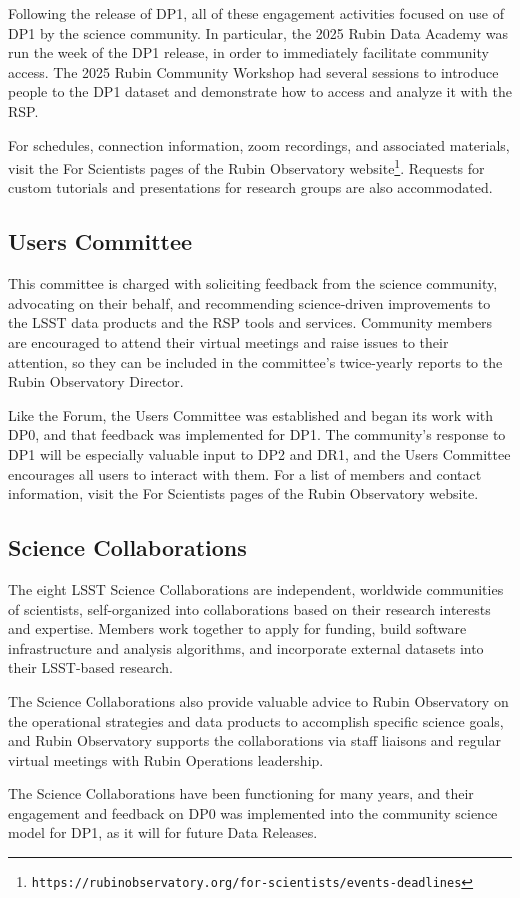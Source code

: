 Following the release of \gls{DP1}, all of these engagement activities focused on use of \gls{DP1} by the science community.
In particular, the 2025 Rubin Data Academy was run the week of the \gls{DP1} release, in order to immediately facilitate community access.
The 2025 Rubin Community Workshop had several sessions to introduce people to the \gls{DP1} dataset and demonstrate how to access and analyze it with the \gls{RSP}.

For schedules, connection information, zoom recordings, and associated materials, visit the For Scientists pages of the Rubin Observatory website\footnote{\nolinkurl{https://rubinobservatory.org/for-scientists/events-deadlines}}.
Requests for custom tutorials and presentations for research groups are also accommodated.


\subsection{Users Committee}
\label{ssec:users_committee}

This committee is charged with soliciting feedback from the science community, advocating on their behalf, and recommending science-driven improvements to the \gls{LSST} data products and the \gls{RSP} tools and services.
Community members are encouraged to attend their virtual meetings and raise issues to their attention, so they can be included in the committee's twice-yearly reports to the Rubin Observatory \gls{Director}.

Like the Forum, the Users Committee was established and began its work with \gls{DP0}, and that feedback was implemented for \gls{DP1}. 
The community's response to \gls{DP1} will be especially valuable input to \gls{DP2} and \gls{DR1}, and the Users Committee encourages all users to interact with them.
For a list of members and contact information, visit the For Scientists pages of the Rubin Observatory website.


\subsection{Science Collaborations}
\label{ssec:science_collaborations}

The eight \gls{LSST} Science Collaborations are independent, worldwide communities of scientists, self-organized into collaborations based on their research interests and expertise.
Members work together to apply for funding, build software infrastructure and analysis algorithms, and incorporate external datasets into their \gls{LSST}-based research.

The Science Collaborations also provide valuable advice to Rubin Observatory on the operational strategies and data products to accomplish specific science goals, and Rubin Observatory supports the collaborations via staff liaisons and regular virtual meetings with Rubin Operations leadership.

The Science Collaborations have been functioning for many years, and their engagement and feedback on \gls{DP0} was implemented into the community science model for \gls{DP1}, as it will for future Data Releases.
